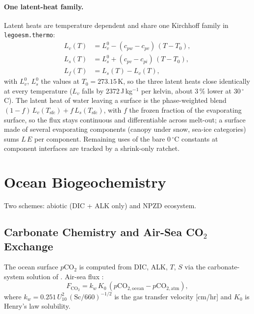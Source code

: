 \documentclass[11pt,a4paper]{article}
\begin{document}
\paragraph{One latent-heat family.}
Latent heats are temperature dependent and share one Kirchhoff family in \texttt{legoesm.thermo}:
\begin{align}
  L_v(T) &= L_v^{0} - (c_{pw}-c_{pv})\,(T-T_0), \\
  L_s(T) &= L_s^{0} + (c_{pv}-c_{pi})\,(T-T_0), \\
  L_f(T) &= L_s(T) - L_v(T),
\end{align}
with $L_v^{0}$, $L_s^{0}$ the values at $T_0=273.15$\,K, so the three latent heats close identically at every temperature ($L_v$ falls by 2372\,J\,kg$^{-1}$ per kelvin, about 3\,\% lower at 30\,$^\circ$C).  The latent heat of water leaving a surface is the phase-weighted blend $(1-f)\,L_v(T_{\mathrm{sfc}})+f\,L_s(T_{\mathrm{sfc}})$, with $f$ the frozen fraction of the evaporating surface, so the flux stays continuous and differentiable across melt-out; a surface made of several evaporating components (canopy under snow, sea-ice categories) sums $L\,E$ per component.  Remaining uses of the bare 0\,$^\circ$C constants at component interfaces are tracked by a shrink-only ratchet.

\section{Ocean Biogeochemistry}

Two schemes: abiotic (DIC + ALK only) and NPZD ecosystem.

\subsection{Carbonate Chemistry and Air-Sea CO$_2$ Exchange}

The ocean surface $p$CO$_2$ is computed from DIC, ALK, $T$, $S$ via the
carbonate-system solution of \citet{Follows2006}.
Air-sea flux \citep{Wanninkhof2014}:
\begin{equation}
  F_{\mathrm{CO}_2} = k_w\,K_0\,(p\mathrm{CO}_{2,\mathrm{ocean}} - p\mathrm{CO}_{2,\mathrm{atm}}),
\end{equation}
where $k_w = 0.251\,U_{10}^2\,(\mathrm{Sc}/660)^{-1/2}$ is the gas transfer velocity [cm/hr] and $K_0$ is Henry's law solubility.
\end{document}
